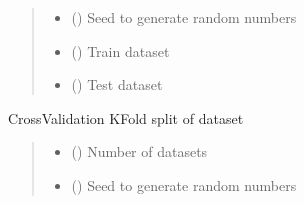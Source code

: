\documentclass[letterpaper,10pt,english]{sphinxmanual}
\begin{document}
\begin{fulllineitems}
\begin{fulllineitems}
\begin{quote}
\begin{description}
\begin{itemize}
\item {} 
\sphinxAtStartPar
{} () \textendash{} Seed to generate random numbers

\end{itemize}

\sphinxAtStartPar
\begin{itemize}
\item {} 
\sphinxAtStartPar
{} () \textendash{} Train dataset

\item {} 
\sphinxAtStartPar
{} () \textendash{} Test dataset

\end{itemize}


\end{description}\end{quote}

\end{fulllineitems}


\begin{fulllineitems}
\label{\detokenize{data/_autosummary/miml.data.miml_dataset.MIMLDataset:miml.data.miml_dataset.MIMLDataset.split_dataset_cv}}
\pysigstartsignatures
\pysiglinewithargsret
{}
{\sphinxparamcomma {}}
{}
\pysigstopsignatures
\sphinxAtStartPar
CrossValidation K\sphinxhyphen{}Fold split of dataset
\begin{quote}\begin{description}
\begin{itemize}
\item {} 
\sphinxAtStartPar
{} () \textendash{} Number of datasets

\item {} 
\sphinxAtStartPar
{} () \textendash{} Seed to generate random numbers


\end{itemize}
\end{description}
\end{quote}
\end{fulllineitems}
\end{fulllineitems}
\end{document}
